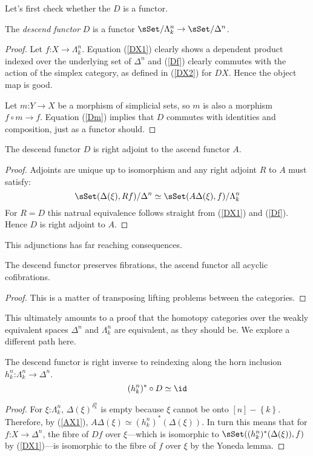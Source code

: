 \documentclass{tac}
\newcommand\of{\mathord:}
\newcommand\set[1]{\left\{#1\right\}}
\newcommand\ri{^*}
\newcommand\simplex[1]{\Delta^{#1}}
\newcommand\horn[2]{\Lambda^{#1}_{#2}}
\newcommand\Y{\Delta}
\begin{document}
Let's first check whether the \(D\) is a functor.

\begin{lemma} The \emph{descend functor}
  \(D\) is a functor \(\sSet/\horn{n}{k} \to \sSet/\simplex{n}\).
\end{lemma}

\begin{proof}
  Let \(f\of X\to \horn{n}{k}\). Equation (\ref{DX1}) clearly
  shows a dependent product indexed over the underlying set of
  \(\simplex{n}\) and (\ref{Df}) clearly commutes with the
  action of the simplex category, as defined in (\ref{DX2}) for
  \(DX\). Hence the object map is good.

  Let \(m\of Y\to X\) be a morphism of simplicial sets, so
  \(m\) is also a morphism \(f\circ m\to f\). Equation 
  (\ref{Dm}) implies that \(D\) commutes with identities
  and composition, just as a functor should.
\end{proof}

\begin{lemma} The descend functor \(D\) is right adjoint to the
  ascend functor \(A\). \label{adjunction}
\end{lemma}

\begin{proof} Adjoints are unique up to isomorphism and any 
  right adjoint \(R\) to \(A\) must satisfy:
  \[ \sSet(\Y(\xi), Rf)/\simplex{n}\simeq
     \sSet(A\Y(\xi),f)/\horn{n}{k} \]
  For \(R=D\) this natrual equivalence follows straight from 
  (\ref{DX1}) and (\ref{Df}). Hence \(D\) is right adjoint to 
  \(A\).
\end{proof}

This adjunctions has far reaching consequences.
\begin{lemma} The descend functor preserves fibrations,
  the ascend functor all acyclic cofibrations.
\end{lemma}

\begin{proof} This is a matter of transposing lifting
  problems between the categories.
\end{proof}

This ultimately amounts to a proof that the homotopy categories
over the weakly equivalent spaces \(\simplex{n}\) and 
\(\horn{n}{k}\) are equivalent, as they should be.
We explore a different path here. %

\begin{lemma} The descend functor is right inverse to reindexing
  along the horn inclusion 
  \(h^n_k\of\horn{n}{k}\to\simplex{n}\).
  \[(h^n_k)\ri\circ D \simeq \id \] \label{inverse}
\end{lemma}

\begin{proof} 
  For \(\xi\of\horn{n}{k}\), \({\Y(\xi)}^{\delta^n_k}\) is
  empty because \(\xi \) cannot be onto \([n]-\set{k}\).
  Therefore, by (\ref{AX1}), 
  \(A\Y(\xi) \simeq (h^n_k)\ri(\Y(\xi))\). In turn this means
  that for \(f\of X\to \simplex{n}\), the fibre of \(Df\) over
  \(\xi \)---which is isomorphic to 
  \(\sSet((h^n_k)\ri(\Y(\xi)),f)\) by (\ref{DX1})---is
  isomorphic to the fibre of \(f\) over \(\xi \) by the Yoneda
  lemma.
\end{proof}
\end{document}
